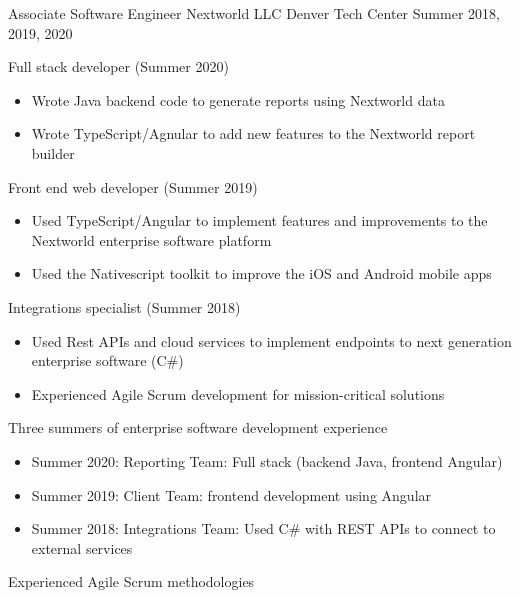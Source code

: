 \vspace{-2.0mm}

\begin{cventries}

  \cventry
    {Associate Software Engineer} %
    {Nextworld LLC} %
    {Denver Tech Center} %
    {Summer 2018, 2019, 2020} %
    {
      \begin{cvitems} %
        \ifcv
      \item {Full stack developer (Summer 2020)}
      \begin{itemize}
        \item {Wrote Java backend code to generate reports using Nextworld data}
        \item {Wrote TypeScript/Agnular to add new features to the Nextworld report builder}
      \end{itemize}
      \item {Front end web developer (Summer 2019)}
      \begin{itemize}
            \item {Used TypeScript/Angular to implement features and
    improvements to the Nextworld enterprise software platform}
        \item {Used the Nativescript toolkit to improve the iOS and
    Android mobile apps}
    \end{itemize}
        \item {Integrations specialist (Summer 2018)}
        \begin{itemize}
                \item {Used Rest APIs and cloud services to implement
                            endpoints to next generation enterprise software (C\#)}
        \item {Experienced Agile Scrum
    development for mission-critical solutions}
    \end{itemize}
    \else
    \item {Three summers of enterprise software development experience}
    \begin{itemize}
    \item {Summer 2020: Reporting Team: Full stack (backend Java, frontend Angular)}
    \item {Summer 2019: Client Team: frontend development using Angular}
    \item {Summer 2018: Integrations Team: Used C\# with REST APIs to connect to external services }
    \end{itemize}
    \fi
    \item {Experienced Agile Scrum methodologies}
      \end{cvitems}
    }


\end{cventries}
